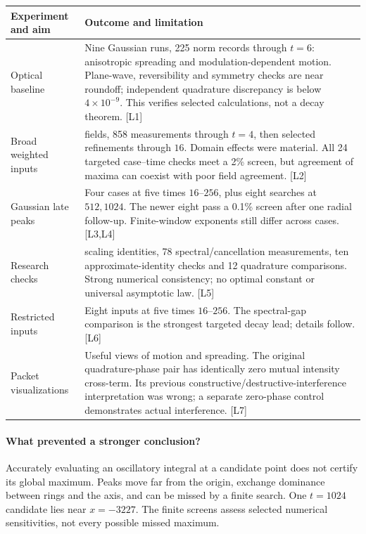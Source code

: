 \documentclass[11pt]{article}
\newcommand{\src}[1]{\textrm{[#1]}}
\begin{document}
\begin{center}\small
\begin{tabular}{@{}>{\raggedright\arraybackslash}p{.25\linewidth}>{\raggedright\arraybackslash}p{.69\linewidth}@{}}
\toprule
Experiment and aim & Outcome and limitation \\\midrule
Optical baseline & Nine Gaussian runs, 225 norm records through $t=6$: anisotropic spreading and modulation-dependent motion. Plane-wave, reversibility and symmetry checks are near roundoff; independent quadrature discrepancy is below $4\times10^{-9}$. This verifies selected calculations, not a decay theorem. \src{L1}\\[.5em]
Broad weighted inputs & 22 fields, 858 measurements through $t=4$, then selected refinements through $16$. Domain effects were material. All 24 targeted case--time checks meet a 2\% screen, but agreement of maxima can coexist with poor field agreement. \src{L2}\\[.5em]
Gaussian late peaks & Four cases at five times $16$--$256$, plus eight searches at $512,1024$. The newer eight pass a 0.1\% screen after one radial follow-up. Finite-window exponents still differ across cases. \src{L3,L4}\\[.5em]
Research checks & 33 scaling identities, 78 spectral/cancellation measurements, ten approximate-identity checks and 12 quadrature comparisons. Strong numerical consistency; no optimal constant or universal asymptotic law. \src{L5}\\[.5em]
Restricted inputs & Eight inputs at five times $16$--$256$. The spectral-gap comparison is the strongest targeted decay lead; details follow. \src{L6}\\[.5em]
Packet visualizations & Useful views of motion and spreading. The original quadrature-phase pair has identically zero mutual intensity cross-term. Its previous constructive/destructive-interference interpretation was wrong; a separate zero-phase control demonstrates actual interference. \src{L7}\\
\bottomrule
\end{tabular}
\end{center}

\paragraph{What prevented a stronger conclusion?}
Accurately evaluating an oscillatory integral at a candidate point does not certify its global maximum. Peaks move far from the origin, exchange dominance between rings and the axis, and can be missed by a finite search. One $t=1024$ candidate lies near $x=-3227$. The finite screens assess selected numerical sensitivities, not every possible missed maximum.
\end{document}
